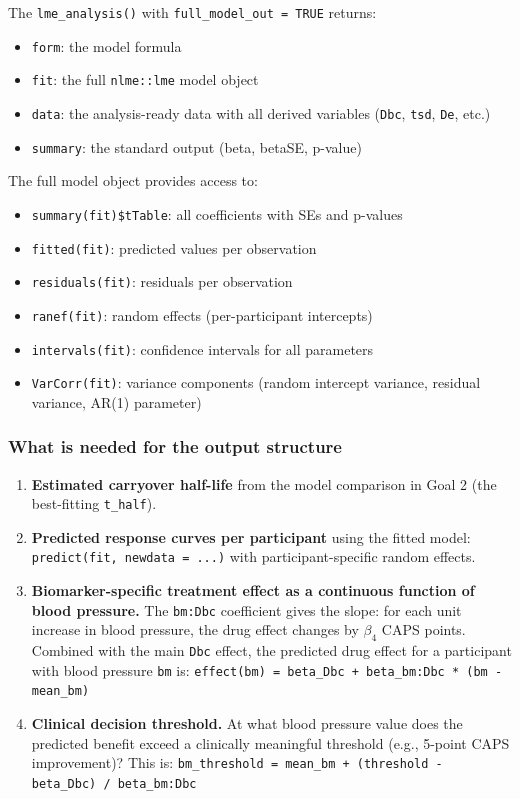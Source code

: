 \documentclass[11pt]{article}
\begin{document}
The \texttt{lme\_analysis()} with \texttt{full\_model\_out = TRUE} returns:

\begin{itemize}
  \item \texttt{form}: the model formula
  \item \texttt{fit}: the full \texttt{nlme::lme} model object
  \item \texttt{data}: the analysis-ready data with all derived
    variables (\texttt{Dbc}, \texttt{tsd}, \texttt{De}, etc.)
  \item \texttt{summary}: the standard output (beta, betaSE, p-value)
\end{itemize}

The full model object provides access to:

\begin{itemize}
  \item \texttt{summary(fit)\$tTable}: all coefficients with SEs and
    p-values
  \item \texttt{fitted(fit)}: predicted values per observation
  \item \texttt{residuals(fit)}: residuals per observation
  \item \texttt{ranef(fit)}: random effects (per-participant intercepts)
  \item \texttt{intervals(fit)}: confidence intervals for all parameters
  \item \texttt{VarCorr(fit)}: variance components (random intercept
    variance, residual variance, AR(1) parameter)
\end{itemize}

\subsubsection{What is needed for the output structure}

\begin{enumerate}
  \item \textbf{Estimated carryover half-life} from the model
    comparison in Goal 2 (the best-fitting \texttt{t\_half}).
  \item \textbf{Predicted response curves per participant} using the
    fitted model: \texttt{predict(fit, newdata = ...)} with
    participant-specific random effects.
  \item \textbf{Biomarker-specific treatment effect as a continuous
    function of blood pressure.} The \texttt{bm:Dbc} coefficient
    gives the slope: for each unit increase in blood
    pressure, the drug effect changes by $\beta_4$ CAPS
    points. Combined with the main \texttt{Dbc} effect, the
    predicted drug effect for a participant with blood
    pressure \texttt{bm} is:
    \texttt{effect(bm) = beta\_Dbc + beta\_bm:Dbc * (bm - mean\_bm)}
  \item \textbf{Clinical decision threshold.} At what blood pressure
    value does the predicted benefit exceed a clinically
    meaningful threshold (e.g., 5-point CAPS improvement)?
    This is: \texttt{bm\_threshold = mean\_bm +
    (threshold - beta\_Dbc) / beta\_bm:Dbc}
\end{enumerate}
\end{document}
